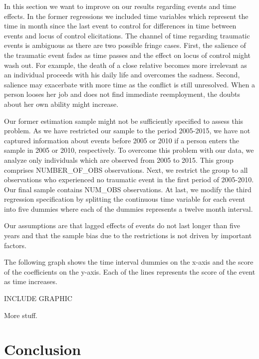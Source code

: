 \documentclass[12pt, a4paper, fleqn, parskip]{scrartcl}
\begin{document}
In this section we want to improve on our results regarding events and time
effects. In the former regressions we included time variables which represent
the time in month since the last event to control for differences in time
between events and locus of control elicitations. The channel of time regarding
traumatic events is ambiguous as there are two possible fringe cases. First,
the salience of the traumatic event fades as time passes and the effect on
locus of control might wash out. For example, the death of a close relative
becomes more irrelevant as an individual proceeds with his daily life and
overcomes the sadness. Second, salience may exacerbate with more time as the
conflict is still unresolved. When a person looses her job and does not find
immediate reemployment, the doubts about her own ability might increase.

Our former estimation sample might not be sufficiently specified to assess this
problem. As we have restricted our sample to the period 2005-2015, we have not
captured information about events before 2005 or 2010 if a person enters the
sample in 2005 or 2010, respectively. To overcome this problem with our data,
we analyze only individuals which are observed from 2005 to 2015. This group
comprises NUMBER\_OF\_OBS observations. Next, we restrict the group to all
observations who experienced no traumatic event in the first period of
2005-2010. Our final sample contains NUM\_OBS observations. At last, we modify
the third regression specification by splitting the continuous time variable
for each event into five dummies where each of the dummies represents a twelve
month interval.

Our assumptions are that lagged effects of events do not last longer than five
years and that the sample bias due to the restrictions is not driven by
important factors.

The following graph shows the time interval dummies on the x-axis and the score
of the coefficients on the y-axis. Each of the lines represents the score of
the event as time increases.

INCLUDE GRAPHIC

More stuff.



\section{Conclusion} %
\label{sec:conclusion}
\end{document}
